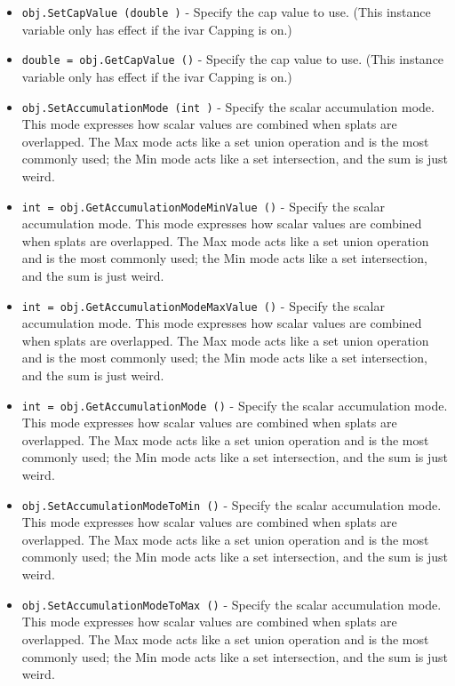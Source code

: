 \begin{itemize}
\item  \verb|obj.SetCapValue (double )| -  Specify the cap value to use. (This instance variable only has effect 
 if the ivar Capping is on.)

\item  \verb|double = obj.GetCapValue ()| -  Specify the cap value to use. (This instance variable only has effect 
 if the ivar Capping is on.)

\item  \verb|obj.SetAccumulationMode (int )| -  Specify the scalar accumulation mode. This mode expresses how scalar
 values are combined when splats are overlapped. The Max mode acts
 like a set union operation and is the most commonly used; the Min
 mode acts like a set intersection, and the sum is just weird.

\item  \verb|int = obj.GetAccumulationModeMinValue ()| -  Specify the scalar accumulation mode. This mode expresses how scalar
 values are combined when splats are overlapped. The Max mode acts
 like a set union operation and is the most commonly used; the Min
 mode acts like a set intersection, and the sum is just weird.

\item  \verb|int = obj.GetAccumulationModeMaxValue ()| -  Specify the scalar accumulation mode. This mode expresses how scalar
 values are combined when splats are overlapped. The Max mode acts
 like a set union operation and is the most commonly used; the Min
 mode acts like a set intersection, and the sum is just weird.

\item  \verb|int = obj.GetAccumulationMode ()| -  Specify the scalar accumulation mode. This mode expresses how scalar
 values are combined when splats are overlapped. The Max mode acts
 like a set union operation and is the most commonly used; the Min
 mode acts like a set intersection, and the sum is just weird.

\item  \verb|obj.SetAccumulationModeToMin ()| -  Specify the scalar accumulation mode. This mode expresses how scalar
 values are combined when splats are overlapped. The Max mode acts
 like a set union operation and is the most commonly used; the Min
 mode acts like a set intersection, and the sum is just weird.

\item  \verb|obj.SetAccumulationModeToMax ()| -  Specify the scalar accumulation mode. This mode expresses how scalar
 values are combined when splats are overlapped. The Max mode acts
 like a set union operation and is the most commonly used; the Min
 mode acts like a set intersection, and the sum is just weird.


\end{itemize}
